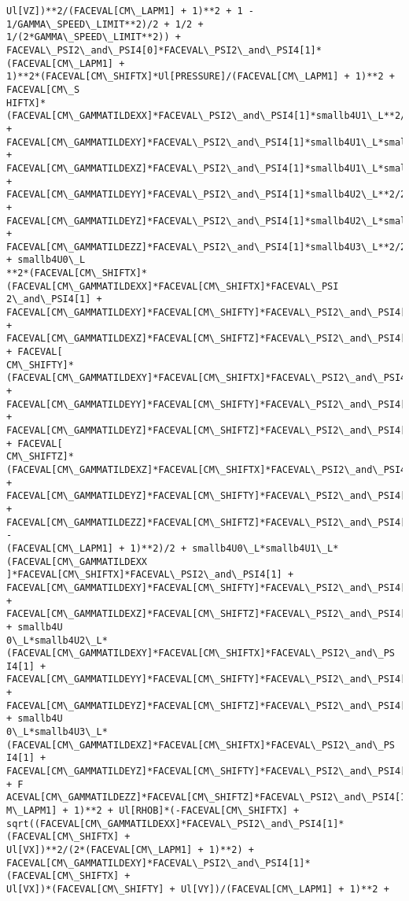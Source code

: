 \documentclass[landscape,letterpaper,10pt,english]{article}
\begin{document}
\begin{Verbatim}[commandchars=\\\{\}]
Ul[VZ])**2/(FACEVAL[CM\_LAPM1] + 1)**2 + 1 - 1/GAMMA\_SPEED\_LIMIT**2)/2 + 1/2 +
1/(2*GAMMA\_SPEED\_LIMIT**2)) +
FACEVAL\_PSI2\_and\_PSI4[0]*FACEVAL\_PSI2\_and\_PSI4[1]*(FACEVAL[CM\_LAPM1] +
1)**2*(FACEVAL[CM\_SHIFTX]*Ul[PRESSURE]/(FACEVAL[CM\_LAPM1] + 1)**2 + FACEVAL[CM\_S
HIFTX]*(FACEVAL[CM\_GAMMATILDEXX]*FACEVAL\_PSI2\_and\_PSI4[1]*smallb4U1\_L**2/2 +
FACEVAL[CM\_GAMMATILDEXY]*FACEVAL\_PSI2\_and\_PSI4[1]*smallb4U1\_L*smallb4U2\_L +
FACEVAL[CM\_GAMMATILDEXZ]*FACEVAL\_PSI2\_and\_PSI4[1]*smallb4U1\_L*smallb4U3\_L +
FACEVAL[CM\_GAMMATILDEYY]*FACEVAL\_PSI2\_and\_PSI4[1]*smallb4U2\_L**2/2 +
FACEVAL[CM\_GAMMATILDEYZ]*FACEVAL\_PSI2\_and\_PSI4[1]*smallb4U2\_L*smallb4U3\_L +
FACEVAL[CM\_GAMMATILDEZZ]*FACEVAL\_PSI2\_and\_PSI4[1]*smallb4U3\_L**2/2 + smallb4U0\_L
**2*(FACEVAL[CM\_SHIFTX]*(FACEVAL[CM\_GAMMATILDEXX]*FACEVAL[CM\_SHIFTX]*FACEVAL\_PSI
2\_and\_PSI4[1] +
FACEVAL[CM\_GAMMATILDEXY]*FACEVAL[CM\_SHIFTY]*FACEVAL\_PSI2\_and\_PSI4[1] +
FACEVAL[CM\_GAMMATILDEXZ]*FACEVAL[CM\_SHIFTZ]*FACEVAL\_PSI2\_and\_PSI4[1]) + FACEVAL[
CM\_SHIFTY]*(FACEVAL[CM\_GAMMATILDEXY]*FACEVAL[CM\_SHIFTX]*FACEVAL\_PSI2\_and\_PSI4[1]
+ FACEVAL[CM\_GAMMATILDEYY]*FACEVAL[CM\_SHIFTY]*FACEVAL\_PSI2\_and\_PSI4[1] +
FACEVAL[CM\_GAMMATILDEYZ]*FACEVAL[CM\_SHIFTZ]*FACEVAL\_PSI2\_and\_PSI4[1]) + FACEVAL[
CM\_SHIFTZ]*(FACEVAL[CM\_GAMMATILDEXZ]*FACEVAL[CM\_SHIFTX]*FACEVAL\_PSI2\_and\_PSI4[1]
+ FACEVAL[CM\_GAMMATILDEYZ]*FACEVAL[CM\_SHIFTY]*FACEVAL\_PSI2\_and\_PSI4[1] +
FACEVAL[CM\_GAMMATILDEZZ]*FACEVAL[CM\_SHIFTZ]*FACEVAL\_PSI2\_and\_PSI4[1]) -
(FACEVAL[CM\_LAPM1] + 1)**2)/2 + smallb4U0\_L*smallb4U1\_L*(FACEVAL[CM\_GAMMATILDEXX
]*FACEVAL[CM\_SHIFTX]*FACEVAL\_PSI2\_and\_PSI4[1] +
FACEVAL[CM\_GAMMATILDEXY]*FACEVAL[CM\_SHIFTY]*FACEVAL\_PSI2\_and\_PSI4[1] +
FACEVAL[CM\_GAMMATILDEXZ]*FACEVAL[CM\_SHIFTZ]*FACEVAL\_PSI2\_and\_PSI4[1]) + smallb4U
0\_L*smallb4U2\_L*(FACEVAL[CM\_GAMMATILDEXY]*FACEVAL[CM\_SHIFTX]*FACEVAL\_PSI2\_and\_PS
I4[1] + FACEVAL[CM\_GAMMATILDEYY]*FACEVAL[CM\_SHIFTY]*FACEVAL\_PSI2\_and\_PSI4[1] +
FACEVAL[CM\_GAMMATILDEYZ]*FACEVAL[CM\_SHIFTZ]*FACEVAL\_PSI2\_and\_PSI4[1]) + smallb4U
0\_L*smallb4U3\_L*(FACEVAL[CM\_GAMMATILDEXZ]*FACEVAL[CM\_SHIFTX]*FACEVAL\_PSI2\_and\_PS
I4[1] + FACEVAL[CM\_GAMMATILDEYZ]*FACEVAL[CM\_SHIFTY]*FACEVAL\_PSI2\_and\_PSI4[1] + F
ACEVAL[CM\_GAMMATILDEZZ]*FACEVAL[CM\_SHIFTZ]*FACEVAL\_PSI2\_and\_PSI4[1]))/(FACEVAL[C
M\_LAPM1] + 1)**2 + Ul[RHOB]*(-FACEVAL[CM\_SHIFTX] +
sqrt((FACEVAL[CM\_GAMMATILDEXX]*FACEVAL\_PSI2\_and\_PSI4[1]*(FACEVAL[CM\_SHIFTX] +
Ul[VX])**2/(2*(FACEVAL[CM\_LAPM1] + 1)**2) +
FACEVAL[CM\_GAMMATILDEXY]*FACEVAL\_PSI2\_and\_PSI4[1]*(FACEVAL[CM\_SHIFTX] +
Ul[VX])*(FACEVAL[CM\_SHIFTY] + Ul[VY])/(FACEVAL[CM\_LAPM1] + 1)**2 +

\end{Verbatim}
\end{document}
